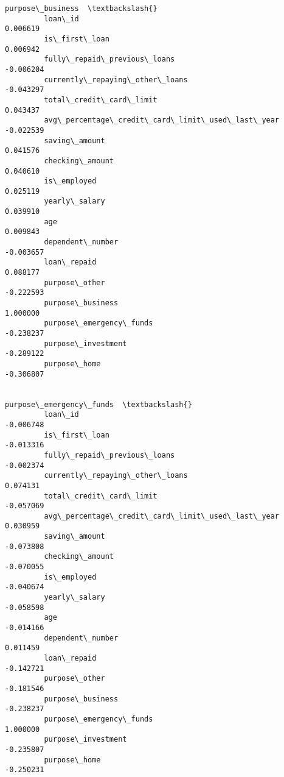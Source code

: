 \documentclass{report}
\begin{document}
\begin{Verbatim}[commandchars=\\\{\}]
                                                          purpose\_business  \textbackslash{}
         loan\_id                                                  0.006619   
         is\_first\_loan                                            0.006942   
         fully\_repaid\_previous\_loans                             -0.006204   
         currently\_repaying\_other\_loans                          -0.043297   
         total\_credit\_card\_limit                                  0.043437   
         avg\_percentage\_credit\_card\_limit\_used\_last\_year         -0.022539   
         saving\_amount                                            0.041576   
         checking\_amount                                          0.040610   
         is\_employed                                              0.025119   
         yearly\_salary                                            0.039910   
         age                                                      0.009843   
         dependent\_number                                        -0.003657   
         loan\_repaid                                              0.088177   
         purpose\_other                                           -0.222593   
         purpose\_business                                         1.000000   
         purpose\_emergency\_funds                                 -0.238237   
         purpose\_investment                                      -0.289122   
         purpose\_home                                            -0.306807   
         
                                                          purpose\_emergency\_funds  \textbackslash{}
         loan\_id                                                        -0.006748   
         is\_first\_loan                                                  -0.013316   
         fully\_repaid\_previous\_loans                                    -0.002374   
         currently\_repaying\_other\_loans                                  0.074131   
         total\_credit\_card\_limit                                        -0.057069   
         avg\_percentage\_credit\_card\_limit\_used\_last\_year                 0.030959   
         saving\_amount                                                  -0.073808   
         checking\_amount                                                -0.070055   
         is\_employed                                                    -0.040674   
         yearly\_salary                                                  -0.058598   
         age                                                            -0.014166   
         dependent\_number                                                0.011459   
         loan\_repaid                                                    -0.142721   
         purpose\_other                                                  -0.181546   
         purpose\_business                                               -0.238237   
         purpose\_emergency\_funds                                         1.000000   
         purpose\_investment                                             -0.235807   
         purpose\_home                                                   -0.250231   
         

\end{Verbatim}
\end{document}
